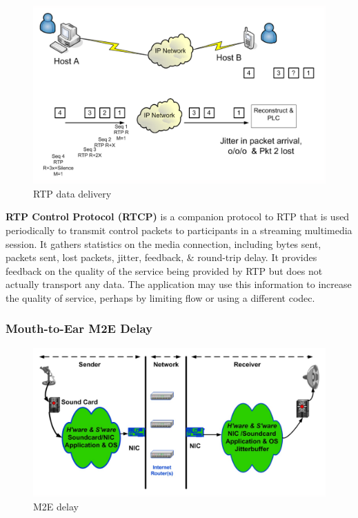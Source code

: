 \documentclass[a4paper,11pt]{article}
\begin{document}
\begin{figure}[H]
    \centering
    \includegraphics[width=\textwidth]{./images/RTPdatadelirvery.png}
    \caption{ RTP data delivery}
\end{figure}

\textbf{RTP Control Protocol (RTCP)} is a companion protocol to RTP that is used periodically to transmit control packets to participants in a streaming multimedia session.
It gathers statistics on the media connection, including bytes sent, packets sent, lost packets, jitter, feedback, \& round-trip delay. 
It provides feedback on the quality of the service being provided by RTP but does not actually transport any data.
The application may use this information to increase the quality of service, perhaps by limiting flow or using a different codec.

\subsubsection{Mouth-to-Ear M2E Delay}
\begin{figure}[H]
    \centering
    \includegraphics[width=\textwidth]{./images/m2e.png}
    \caption{ M2E delay }
\end{figure}
\end{document}
